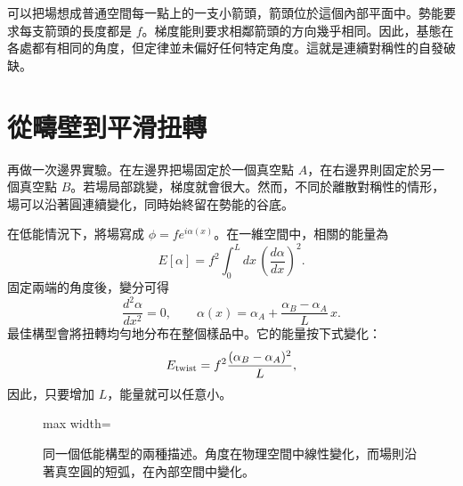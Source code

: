 可以把場想成普通空間每一點上的一支小箭頭，箭頭位於這個內部平面中。勢能要求每支箭頭的長度都是 \(f\)。梯度能則要求相鄰箭頭的方向幾乎相同。因此，基態在各處都有相同的角度，但定律並未偏好任何特定角度。這就是連續對稱性的自發破缺。

\section{從疇壁到平滑扭轉}

再做一次邊界實驗。在左邊界把場固定於一個真空點 \(A\)，在右邊界則固定於另一個真空點 \(B\)。若場局部跳變，梯度就會很大。然而，不同於離散對稱性的情形，場可以沿著圓連續變化，同時始終留在勢能的谷底。

在低能情況下，將場寫成 \(\phi=f e^{i\alpha(x)}\)。在一維空間中，相關的能量為
\begin{equation}
  E[\alpha]
  =f^2\int_0^L dx\,\left(\frac{d\alpha}{dx}\right)^2.
  \label{eq:l07-angle-functional}
\end{equation}
固定兩端的角度後，變分可得
\begin{equation}
  \frac{d^2\alpha}{dx^2}=0,
  \qquad
  \alpha(x)=\alpha_A+
    \frac{\alpha_B-\alpha_A}{L}\,x.
  \label{eq:l07-linear-twist}
\end{equation}
最佳構型會將扭轉均勻地分布在整個樣品中。它的能量按下式變化：
\begin{equation}
  E_{\rm twist}
  =f^2\frac{(\alpha_B-\alpha_A)^2}{L},
  \label{eq:l07-twist-energy}
\end{equation}
因此，只要增加 \(L\)，能量就可以任意小。

\begin{figure}[htbp]
\centering
\begin{adjustbox}{max width=\linewidth}
\end{adjustbox}
\caption{同一個低能構型的兩種描述。角度在物理空間中線性變化，而場則沿著真空圓的短弧，在內部空間中變化。}
\end{figure}

